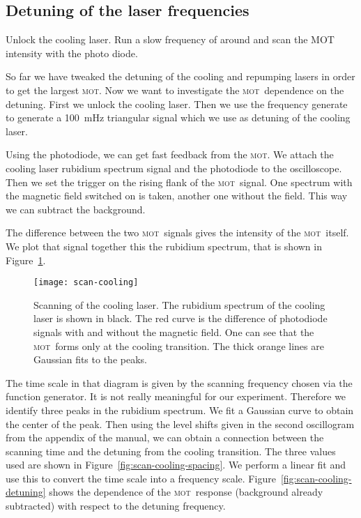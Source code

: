 \documentclass[11pt, english, fleqn, DIV=15, headinclude, BCOR=2cm]{scrreprt}
\newcommand\mot{\textsc{mot}}
\begin{document}
\subsection{Detuning of the laser frequencies}

Unlock the cooling laser. Run a slow frequency of around
and scan the MOT intensity with the photo diode. 

So far we have tweaked the detuning of the cooling and repumping lasers in
order to get the largest \mot. Now we want to investigate the \mot\ dependence
on the detuning. First we unlock the cooling laser. Then we use the frequency
generate to generate a \SI{100}{\milli\hertz} triangular signal which we use
as detuning of the cooling laser.

Using the photodiode, we can get fast feedback from the \mot. We attach the
cooling laser rubidium spectrum signal and the photodiode to the oscilloscope.
Then we set the trigger on the rising flank of the \mot\ signal. One spectrum
with the magnetic field switched on is taken, another one without the field.
This way we can subtract the background.

The difference between the two \mot\ signals gives the intensity of the \mot\
itself. We plot that signal together this the rubidium spectrum, that is shown
in Figure~\ref{fig:scan-cooling}.


\begin{figure}
    \centering
    \texttt{[image: scan-cooling]}
    \caption{%
        Scanning of the cooling laser. The rubidium spectrum of the cooling
        laser is shown in black. The red curve is the difference of photodiode
        signals with and without the magnetic field. One can see that the \mot\
        forms only at the cooling transition. The thick orange lines are
        Gaussian fits to the peaks.
    }
    \label{fig:scan-cooling}
\end{figure}

The time scale in that diagram is given by the scanning frequency chosen via
the function generator. It is not really meaningful for our experiment.
Therefore we identify three peaks in the rubidium spectrum. We fit a Gaussian
curve to obtain the center of the peak. Then using the level shifts given in
the second oscillogram from the appendix of the manual, we can obtain a
connection between the scanning time and the detuning from the cooling
transition. The three values used are shown in
Figure~\ref{fig:scan-cooling-spacing}. We perform a linear fit and use this to
convert the time scale into a frequency scale.
Figure~\ref{fig:scan-cooling-detuning} shows the dependence of the \mot\
response (background already subtracted) with respect to the detuning
frequency.
\end{document}
